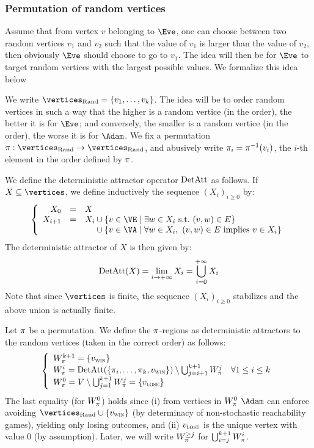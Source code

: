 \subsubsection{Permutation of random vertices}

Assume that from vertex $v$ belonging to $\Eve$, one can choose between
two random vertices $v_1$ and $v_2$ such that the value of $v_1$ is
larger than the value of $v_2$, then obviously $\Eve$ should choose to
go to $v_1$. The idea will then be for $\Eve$ to target random vertices
with the largest possible values. We formalize this idea below




We write $\Randomvertices = \{v_1,\ldots,v_k\}$. 
The idea will be to order random vertices in such a way that the
higher is a random vertice (in the order), the better it is for $\Eve$;
and conversely, the smaller is a random vertice (in the order), the
worse it is for $\Adam$. We fix a permutation
$\perm: \Randomvertices \to \Randomvertices$, and abusively write
$\pi_i = \pi^{-1}(v_i)$, the $i$-th element in the order defined
by $\pi$.

We define the deterministic attractor operator $\textrm{DetAtt}$ as
follows. If $X \subseteq \vertices$, we define inductively the
sequence $(X_i)_{i \ge 0}$ by:
\[
\left\{
\begin{array}{rcl}
X_0 & =& X \\
X_{i+1} &=& X_i \cup \{v \in \Evevertices \mid \exists w \in X_i\
\text{s.t.}\ (v,w) \in E\} \\
 && \phantom{X_i} \cup \{v \in \Adamvertices \mid \forall w \in X_i,\ 
(v,w) \in E\ \text{implies}\ v \in X_i\}
\end{array}
\right.
\]
The deterministic attractor of $X$ is then given by:
\[
\textrm{DetAtt}(X) = \lim_{i \to +\infty} X_i = \bigcup_{i =0}^{+\infty} X_i
\]
Note that since $\vertices$ is finite, the sequence $(X_i)_{i \ge 0}$
stabilizes and the above union is actually finite.

Let $\pi$ be a permutation. We define the $\pi$-regions as
deterministic attractors to the random vertices (taken in the correct
order) as follows:
\[
\left\{
\begin{array}{l}
W_\pi^{k+1}  = \{v_{\textsc{win}}\} \\
W_\pi^i =
\textrm{DetAtt}(\{\pi_i,\ldots,\pi_k,v_{\textsc{win}}\}) \setminus \bigcup_{j=i+1}^{k+1}
W_\pi^j\quad \forall 1 \le i \le k \\ 
W_\pi^0 = V \setminus \bigcup_{j=1}^{k+1} W_\pi^j = \{v_{\textsc{lose}}\}
\end{array}
\right.
\]
The last equality (for $W_\pi^0$) holds since (i) from vertices in
$W_\pi^0$ $\Adam$ can enforce avoiding $\Randomvertices \cup
\{\vwin\}$ (by determinacy of non-stochastic reachability games), yielding only losing outcomes, and
(ii) $v_{\textsc{lose}}$ is the unique vertex with value $0$ (by
assumption). Later, we will write $W_\pi^{\ge j}$ for
$\bigcup_{i=j}^{k+1} W_\pi^i$.

